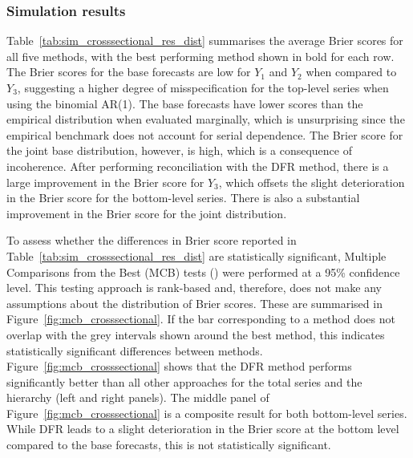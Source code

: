 \documentclass[a4paper,review,11pt,authoryear]{elsarticle}
\theoremstyle{definition}
\begin{document}
    \subsubsection{Simulation results}
    Table~\ref{tab:sim_crosssectional_res_dist} summarises the average Brier scores for all five methods, with the best performing method shown in bold for each row. The Brier scores for the base forecasts are low for $Y_1$ and $Y_2$ when compared to $Y_3$, suggesting a higher degree of misspecification for the top-level series when using the binomial AR(1). The base forecasts have lower scores than the empirical distribution when evaluated marginally, which is unsurprising since the empirical benchmark does not account for serial dependence. The Brier score for the joint base distribution, however, is high, which is a consequence of incoherence. After performing reconciliation with the DFR method, there is a large improvement in the Brier score for $Y_3$, which offsets the slight deterioration in the Brier score for the bottom-level series. There is also a substantial improvement in the Brier score for the joint distribution.
    
    To assess whether the differences in Brier score reported in Table~\ref{tab:sim_crosssectional_res_dist} are statistically significant, Multiple Comparisons from the Best (MCB) tests (\citealp{koningM3CompetitionStatistical2005}) were performed at a 95\% confidence level.
    This testing approach is rank-based and, therefore, does not make any assumptions about the distribution of Brier scores. These are summarised in Figure~\ref{fig:mcb_crosssectional}. If the bar corresponding to a method does not overlap with the grey intervals shown around the best method, this indicates statistically significant differences between methods.
    Figure~\ref{fig:mcb_crosssectional} shows that the DFR method performs significantly better than all other approaches for the total series and the hierarchy (left and right panels). The middle panel of Figure~\ref{fig:mcb_crosssectional} is a composite result for both bottom-level series. While DFR leads to a slight deterioration in the Brier score at the bottom level compared to the base forecasts, this is not statistically significant.
\end{document}
